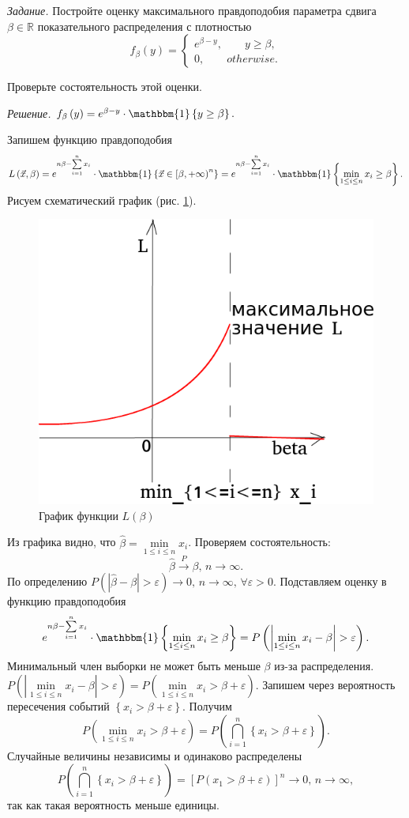 \textit{Задание.}
Постройте оценку максимального правдоподобия параметра сдвига $ \beta \in \mathbb{R}$
показательного распределения с плотностью
$$f_{ \beta } \left( y \right) =
  \begin{cases}
    e^{ \beta - y}, \qquad y \geq \beta, \\
    0, \qquad otherwise.
  \end{cases}$$

Проверьте состоятельность этой оценки.

\textit{Решение.}
$f_{ \beta } \left( y \right) = e^{ \beta - y} \cdot \mathbbm{1} \left\{ y \geq \beta \right\}.$

Запишем функцию правдоподобия
$$L \left( \vec{x}, \beta \right) =
  e^{n \beta - \sum \limits_{i = 1}^n x_i} \cdot
  \mathbbm{1} \left\{ \vec{x} \in \left[ \beta, + \infty \right)^n \right\} =
  e^{n \beta - \sum \limits_{i = 1}^n x_i} \cdot
  \mathbbm{1} \left\{ \min \limits_{1 \leq i \leq n} x_i \geq \beta \right\}.$$
Рисуем схематический график (рис. \ref{fig:47}).

\begin{figure}[h!]
  \centering
  \includegraphics[width=.4\textwidth]{./pictures/4_7.png}
  \caption{График функции $L \left( \beta \right) $}
  \label{fig:47}
\end{figure}

Из графика видно, что $ \hat{ \beta } = \min \limits_{1 \leq i \leq n} x_i$.
Проверяем состоятельность:
$$ \hat{ \beta } \overset{P}{ \to } \beta, \, n \to \infty.$$
По определению
$P \left( \left| \hat{ \beta } - \beta \right| > \varepsilon \right) \to 0,
  \, n \to \infty, \,
  \forall \varepsilon > 0$.
Подставляем оценку в функцию правдоподобия
$$e^{n \beta - \sum \limits_{i = 1}^n x_i} \cdot
  \mathbbm{1} \left\{ \min \limits_{1 \leq i \leq n} x_i \geq \beta \right\} =
  P \left( \left| \min \limits_{1 \leq i \leq n} x_i - \beta \right| > \varepsilon \right).$$
Минимальный член выборки не может быть меньше $ \beta $ из-за распределения.
$P \left( \left| \min \limits_{1 \leq i \leq n} x_i - \beta \right| > \varepsilon \right) =
  P \left( \min \limits_{1 \leq i \leq n} x_i > \beta + \varepsilon \right).$
Запишем через вероятность пересечения событий $ \left\{ x_i > \beta + \varepsilon \right\} $.
Получим
$$P \left( \min \limits_{1 \leq i \leq n} x_i > \beta + \varepsilon \right) =
  P \left( \bigcap \limits_{i = 1}^n \left\{ x_i > \beta + \varepsilon \right\} \right).$$
Случайные величины независимы и одинаково распределены
$$P \left( \bigcap \limits_{i = 1}^n \left\{ x_i > \beta + \varepsilon \right\} \right) =
  \left[ P \left( x_1 > \beta + \varepsilon \right) \right]^n \to 0, \,
  n \to \infty,$$
так как такая вероятность меньше единицы.

